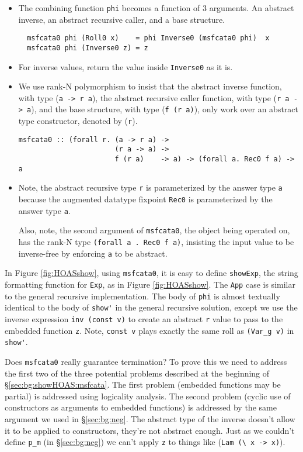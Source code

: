 \documentclass[letterpaper,12pt]{article}
\begin{document}
\begin{itemize}
  \item The combining function \verb|phi| becomes a function of 3 arguments.
        An abstract inverse, an 
        abstract recursive caller, and a base structure.
\begin{verbatim}
  msfcata0 phi (Roll0 x)    = phi Inverse0 (msfcata0 phi)  x
  msfcata0 phi (Inverse0 z) = z
\end{verbatim}
  \item For inverse values, return the value inside \verb|Inverse0| as it is.

  \item We use rank-N polymorphism to insist that 
        the abstract inverse function, with type (\verb|a -> r a|),
        the abstract recursive caller function, with type (\verb|r a -> a|), and
        the base structure, with type (\verb|f (r a)|), only work
        over an abstract type constructor, denoted by (\verb|r|).
\begin{verbatim}
msfcata0 :: (forall r. (a -> r a) ->
                       (r a -> a) ->
                       f (r a)    -> a) -> (forall a. Rec0 f a) -> a
\end{verbatim}
  \item Note, the abstract recursive type \verb|r| is parameterized by
        the answer type \verb|a| because the augmented datatype fixpoint \verb|Rec0|
        is parameterized by the answer type \verb|a|.

        Also, note, the second argument of \verb|msfcata0|, the object being
        operated on, has the rank-N type
        \verb|(forall a . Rec0 f a)|, insisting the input value to be inverse-free
        by enforcing \verb|a| to be abstract.
\end{itemize}

In Figure \ref{fig:HOASshow}, using \verb|msfcata0|, it is easy to define \verb|showExp|,
the string formatting function for \verb|Exp|, as in Figure \ref{fig:HOASshow}.
The \verb|App| case is similar to the general recursive implementation.
The body of \verb|phi| is almost textually identical to the body of \verb|show'|
in the general recursive solution, except we use the inverse expression
\verb|inv (const v)| to create an abstract \verb|r| value to pass to
the embedded function \verb|z|.  Note, \verb|const v| plays exactly
the same roll as \verb|(Var_g v)| in \verb|show'|.

Does \verb|msfcata0| really guarantee termination?  To prove this we need to
address the first two of the three potential problems described at
the beginning of \S\ref{sec:bg:showHOAS:msfcata}.  The first problem
(embedded functions may be partial) is addressed using logicality analysis.
The second problem (cyclic use of constructors as arguments to
embedded functions) is addressed by the same argument we used
in \S\ref{sec:bg:neg}.  The abstract type of the inverse
doesn't allow it to be applied to constructors, they're not abstract enough. 
Just as we couldn't define \verb|p_m| (in \S\ref{sec:bg:neg})
we can't apply \verb|z| to things like {\small (\verb|Lam (\ x -> x)|)}.
\end{document}
